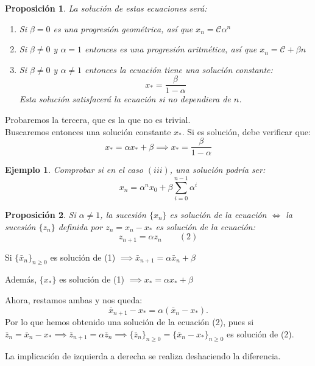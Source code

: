 \documentclass[11pt, a4paper]{article}
\makeatletter
\newif\IfInSansMode
\let\oldsf\sffamily
\renewcommand*{\sffamily}{\oldsf\mathversion{sans}\InSansModetrue}
\let\oldnorm\normalfont
\renewcommand*{\normalfont}{\oldnorm\InSansModefalse\mathversion{normal}}
\renewenvironment{proof}[1][\proofname] {\vspace{-15pt}\par\pushQED{\qed}\normalfont\topsep6\p@\@plus6\p@\relax\trivlist\item[\hskip\labelsep\it#1\@addpunct{.}]\ignorespaces}{\popQED\endtrivlist\@endpefalse}
\numberwithin{equation}{section}
\renewenvironment{proof}[1][\proofname] {\par\pushQED{\qed}\normalfont\topsep6\p@\@plus6\p@\relax\trivlist\item[\hskip\labelsep\itshape\sffamily#1\@addpunct{.}]\ignorespaces}{\popQED\endtrivlist\@endpefalse}
\theoremstyle{theorem-style}
\newtheorem{nprop}{Proposición}[section]
\theoremstyle{definition-style}
\theoremstyle{remark-style}
\theoremstyle{example-style}
\newtheorem{ejemplo}{Ejemplo}[section]
\newenvironment{nlist}
{\begin{enumerate}
    \renewcommand\labelenumi{(\emph{\roman{enumi})}}}
  {\end{enumerate}}
\makeatother
\begin{document}
\begin{nprop}
	La solución de estas ecuaciones será:
	\begin{nlist}
	\item Si $\beta = 0$ es una progresión geométrica, así que $x_n =  \mathcal{C} \alpha^n$
	\item Si $\beta \ne 0$ y $\alpha  = 1$ entonces es una progresión aritmética, así que $x_n = \mathcal{C} + \beta n$
	\item Si $\beta \ne 0 $ y $\alpha \ne 1 $ entonces la ecuación tiene una solución constante:
	\[
	x_* = \frac{\beta}{1-\alpha}
	\]
	Esta solución satisfacerá la ecuación si no dependiera de $n$.
\end{nlist}
\end{nprop}
\begin{proof}
	Probaremos la tercera, que es la que no es trivial.\\
	Buscaremos entonces una solución constante $x_*$. Si es solución, debe verificar que:
$$x_* =  \alpha x_* + \beta \implies  x_* = \dfrac{\beta}{1 - \alpha}$$
\end{proof}

\begin{ejemplo}
	Comprobar si en el caso $(iii)$, una solución podría ser: \[x_n = \alpha^n x_0 + \beta \sum_{i=0}^{n-1}\alpha^i\]
\end{ejemplo}


\begin{nprop}
	Si $\alpha \ne 1$, la sucesión $\{x_n\}$ es solución de la ecuación $\iff$ la sucesión $\{z_n\}$ definida por $z_n = x_n - x_*$ es solución de la ecuación:
	\[
	z_{n+1} =  \alpha z_n\quad \quad (2)
	\]
\end{nprop}
\begin{proof}
	Si $\{\bar{x}_n\}_{n\geq 0}$ es solución de (1) $\implies \bar{x}_{n+1}= \alpha\bar{x}_n+\beta$
	
	
	Además, $\{x_*\}$ es solución de (1) $\implies x_*= \alpha x_*+\beta$
	
	Ahora, restamos ambas y nos queda:
	\[
	\bar{x}_{n+1} - x_*= \alpha (\bar{x}_n - x_*).
	\]
	Por lo que hemos obtenido una solución de la ecuación (2), pues si $\bar{z}_n= \bar{x}_n - x_*\implies \bar{z}_{n+1}= \alpha \bar{z}_n \implies \{\bar{z}_n\}_{n \ge 0} = \{\bar{x}_n - x_*\}_{n \ge 0}$ es solución de (2).
	
	La implicación de izquierda a derecha se realiza deshaciendo la diferencia.
	
\end{proof}
\end{document}
